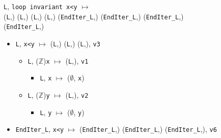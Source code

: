 \begin{figure}[bt]
  \lstinline'L', \lstinline'loop invariant x<y'
  $\mapsto$\\
  (\lstinline'L',)
  (\lstinline'L',)
  (\lstinline'L',)
  (\lstinline'L',)
  (\lstinline'EndIter_L',)
  (\lstinline'EndIter_L',)
  (\lstinline'EndIter_L',)
  (\lstinline'EndIter_L',)
  \begin{itemize}
  \item \lstinline'L', \lstinline'x<y'
    $\mapsto$
    (\lstinline'L',)
    (\lstinline'L',)
    (\lstinline'L',),
    \lstinline'v3'
    \begin{itemize}
    \item \lstinline'L', ($\mathbb{Z}$)\lstinline'x'
      $\mapsto$
      (\lstinline'L',),
      \lstinline'v1'
      \begin{itemize}
      \item \lstinline'L', \lstinline'x' $\mapsto$ ($\emptyset$, \lstinline'x')
      \end{itemize}
    \item \lstinline'L', ($\mathbb{Z}$)\lstinline'y'
      $\mapsto$
      (\lstinline'L',),
      \lstinline'v2'
      \begin{itemize}
      \item \lstinline'L', \lstinline'y' $\mapsto$ ($\emptyset$, \lstinline'y')
      \end{itemize}
    \end{itemize}
  \item \lstinline'EndIter_L', \lstinline'x<y'
    $\mapsto$
    (\lstinline'EndIter_L',)
    (\lstinline'EndIter_L',)
    (\lstinline'EndIter_L',),
    \lstinline'v6'
  \end{itemize}~\\


\end{figure}
